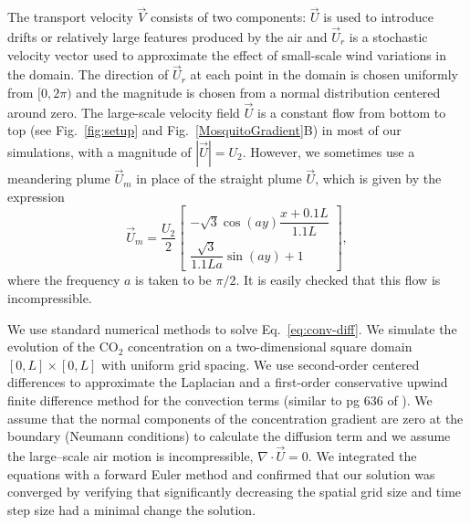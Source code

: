 \documentclass[10pt]{article}
\begin{document}
The transport velocity $\vec{V}$ consists of two components: $\vec{U}$ is used to introduce drifts or
relatively large features produced by the air and
$\vec{U}_r$ is a stochastic velocity vector used to approximate the effect of small-scale wind variations in the domain. The direction of $\vec{U}_r$ at each point in the domain is chosen uniformly from $[0,2\pi)$ and the magnitude is chosen from a normal distribution centered around zero. 
The large-scale velocity field $\vec{U}$ is a constant flow from bottom to top (see Fig.~\ref{fig:setup} and Fig.~\ref{MosquitoGradient}B) in most of our simulations, with a magnitude of $|\vec{U}| = U_2$. However, we sometimes use a meandering plume $\vec{U}_m$ in place of the straight plume $\vec{U}$, which is given by the expression
\begin{equation}
	\vec{U}_m = \frac{U_2}{2}\begin{bmatrix} -\sqrt{3}\cos(ay)\dfrac{x+0.1L}{1.1L} \label{eqn:meander} \\
	 \dfrac{\sqrt{3}}{1.1L a}\sin(ay)+1\end{bmatrix}, 
\end{equation}
where the frequency $a$ is taken to be $\pi/2$. It is easily checked that this flow is incompressible. 

We use standard numerical methods to solve Eq.~\eqref{eq:conv-diff}. We simulate the evolution of the CO$_2$ concentration on a two-dimensional square domain $[0,L] \times [0,L]$ with uniform grid spacing.  We use second-order centered differences to approximate the Laplacian and  a first-order conservative upwind finite difference method for the convection terms (similar to pg 636 of \cite{Leveque1996}). We assume that the normal components of the concentration gradient are zero at the boundary (Neumann conditions) to calculate the diffusion term and we assume the large--scale air motion is incompressible, $\nabla\cdot \vec{U} = 0$.  We integrated the equations with a forward Euler method and confirmed that our solution was converged by verifying that significantly decreasing the spatial grid size and time step size had a minimal change the solution. 
\end{document}
